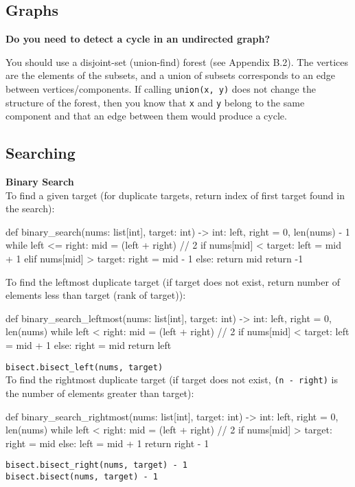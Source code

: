 \documentclass[12pt]{article}
\begin{document}
\subsection*{Graphs}
\begin{adjustwidth}{2em}{0pt}
\textbf{Do you need to detect a cycle in an undirected graph?} \medskip

You should use a disjoint-set (union-find) forest (see Appendix B.2). The vertices are the elements of the subsets, and a union of subsets corresponds to an edge between vertices/components. If calling \texttt{union(x, y)} does not change the structure of the forest, then you know that \texttt{x} and \texttt{y} belong to the same component and that an edge between them would produce a cycle.
\end{adjustwidth}

\subsection*{Searching}

\begin{adjustwidth}{2em}{0pt}
\textbf{Binary Search}\medskip \\
To find a given target (for duplicate targets, return index of first target found in the search):
\begin{python}
def binary_search(nums: list[int], target: int) -> int:
    left, right = 0, len(nums) - 1
    while left <= right:
        mid = (left + right) // 2
        if nums[mid] < target:
            left = mid + 1
        elif nums[mid] > target:
            right = mid - 1
        else:
            return mid
    return -1
\end{python}
\bigskip

To find the leftmost duplicate target (if target does not exist, return number of elements less than target (rank of target)):
\begin{python}
def binary_search_leftmost(nums: list[int], target: int) -> int:
    left, right = 0, len(nums)
    while left < right:
        mid = (left + right) // 2
        if nums[mid] < target:
            left = mid + 1
        else:
            right = mid
    return left
\end{python}
\texttt{bisect.bisect\_left(nums, target)} \\

To find the rightmost duplicate target (if target does not exist, \texttt{(n - right)} is the number of elements greater than target):
\begin{python}
def binary_search_rightmost(nums: list[int], target: int) -> int:
    left, right = 0, len(nums)
    while left < right:
        mid = (left + right) // 2
        if nums[mid] > target:
            right = mid
        else:
            left = mid + 1
    return right - 1
\end{python}
\texttt{bisect.bisect\_right(nums, target) - 1} \\
\texttt{bisect.bisect(nums, target) - 1}
\end{adjustwidth}
\end{document}
